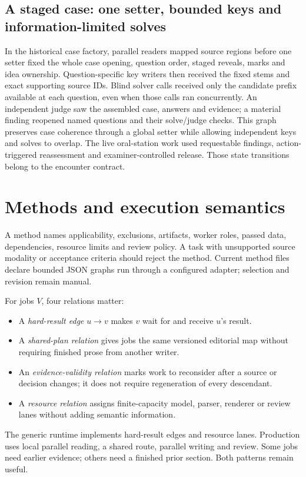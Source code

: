 \documentclass[11pt,letterpaper]{article}
\begin{document}
\subsection{A staged case: one setter, bounded keys and information-limited solves}
In the historical case factory, parallel readers mapped source regions before one setter fixed the whole case opening, question order, staged reveals, marks and idea ownership. Question-specific key writers then received the fixed stems and exact supporting source IDs. Blind solver calls received only the candidate prefix available at each question, even when those calls ran concurrently. An independent judge saw the assembled case, answers and evidence; a material finding reopened named questions and their solve/judge checks. This graph preserves case coherence through a global setter while allowing independent keys and solves to overlap. The live oral-station work used requestable findings, action-triggered reassessment and examiner-controlled release. Those state transitions belong to the encounter contract.

\section{Methods and execution semantics}
A method names applicability, exclusions, artifacts, worker roles, passed data, dependencies, resource limits and review policy. A task with unsupported source modality or acceptance criteria should reject the method. Current method files declare bounded JSON graphs run through a configured adapter; selection and revision remain manual.

For jobs $V$, four relations matter:
\begin{itemize}
\item A \emph{hard-result edge} $u\rightarrow v$ makes $v$ wait for and receive $u$'s result.
\item A \emph{shared-plan relation} gives jobs the same versioned editorial map without requiring finished prose from another writer.
\item An \emph{evidence-validity relation} marks work to reconsider after a source or decision changes; it does not require regeneration of every descendant.
\item A \emph{resource relation} assigns finite-capacity model, parser, renderer or review lanes without adding semantic information.
\end{itemize}
The generic runtime implements hard-result edges and resource lanes. Production uses local parallel reading, a shared route, parallel writing and review. Some jobs need earlier evidence; others need a finished prior section. Both patterns remain useful.
\end{document}
